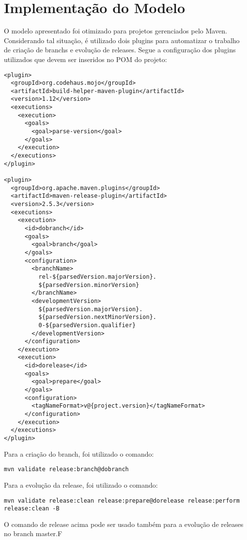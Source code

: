 \section{Implementação do Modelo}
\label{sec:implmodelo}
O modelo apresentado foi otimizado para projetos gerenciados pelo Maven. Considerando tal situação, é utilizado dois plugins para automatizar o trabalho de criação de branchs e evolução de releases. Segue a configuração dos plugins utilizados que devem ser inseridos no POM do projeto:

\begin{verbatim}
<plugin>
  <groupId>org.codehaus.mojo</groupId>
  <artifactId>build-helper-maven-plugin</artifactId>
  <version>1.12</version>
  <executions>
    <execution>
      <goals>
        <goal>parse-version</goal>
      </goals>
    </execution>
  </executions>
</plugin>

<plugin>
  <groupId>org.apache.maven.plugins</groupId>
  <artifactId>maven-release-plugin</artifactId>
  <version>2.5.3</version>
  <executions>
    <execution>
      <id>dobranch</id>
      <goals>
        <goal>branch</goal>
      </goals>
      <configuration>
        <branchName>
          rel-${parsedVersion.majorVersion}.
          ${parsedVersion.minorVersion}
        </branchName>
        <developmentVersion>
          ${parsedVersion.majorVersion}.
          ${parsedVersion.nextMinorVersion}.
          0-${parsedVersion.qualifier} 
        </developmentVersion>
      </configuration>
    </execution>
    <execution>
      <id>dorelease</id>
      <goals>
        <goal>prepare</goal>
      </goals>
      <configuration>
        <tagNameFormat>v@{project.version}</tagNameFormat>
      </configuration>
    </execution>
  </executions>
</plugin>
\end{verbatim}

Para a criação do branch, foi utilizado o comando:

\begin{verbatim}
mvn validate release:branch@dobranch
\end{verbatim}

Para a evolução da release, foi utilizado o comando:

\begin{verbatim}
mvn validate release:clean release:prepare@dorelease release:perform release:clean -B
\end{verbatim}

O comando de release acima pode ser usado também para a evolução de releases no branch master.F